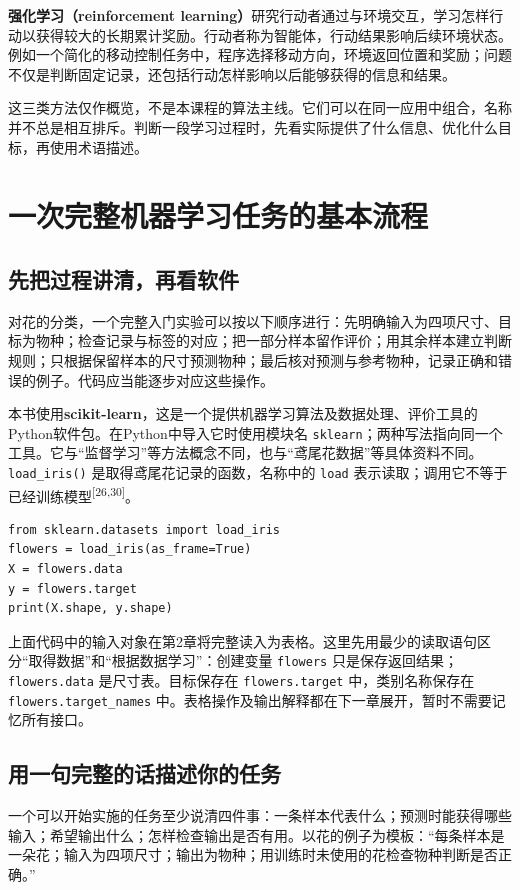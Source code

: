 \textbf{强化学习（reinforcement learning）}研究行动者通过与环境交互，学习怎样行动以获得较大的长期累计奖励。行动者称为智能体，行动结果影响后续环境状态。例如一个简化的移动控制任务中，程序选择移动方向，环境返回位置和奖励；问题不仅是判断固定记录，还包括行动怎样影响以后能够获得的信息和结果。

这三类方法仅作概览，不是本课程的算法主线。它们可以在同一应用中组合，名称并不总是相互排斥。判断一段学习过程时，先看实际提供了什么信息、优化什么目标，再使用术语描述。

\section{一次完整机器学习任务的基本流程}
\subsection{先把过程讲清，再看软件}
对花的分类，一个完整入门实验可以按以下顺序进行：先明确输入为四项尺寸、目标为物种；检查记录与标签的对应；把一部分样本留作评价；用其余样本建立判断规则；只根据保留样本的尺寸预测物种；最后核对预测与参考物种，记录正确和错误的例子。代码应当能逐步对应这些操作。

本书使用\textbf{scikit-learn}，这是一个提供机器学习算法及数据处理、评价工具的Python软件包。在Python中导入它时使用模块名 \texttt{sklearn}；两种写法指向同一个工具。它与“监督学习”等方法概念不同，也与“鸢尾花数据”等具体资料不同。\texttt{load\_iris()} 是取得鸢尾花记录的函数，名称中的 \texttt{load} 表示读取；调用它不等于已经训练模型\textsuperscript{[26,30]}。

\begin{lstlisting}[caption={只读取已介绍的鸢尾花数据，不进行训练}]
from sklearn.datasets import load_iris
flowers = load_iris(as_frame=True)
X = flowers.data
y = flowers.target
print(X.shape, y.shape)
\end{lstlisting}

\noindent 上面代码中的输入对象在第2章将完整读入为表格。这里先用最少的读取语句区分“取得数据”和“根据数据学习”：创建变量 \texttt{flowers} 只是保存返回结果；\texttt{flowers.data} 是尺寸表。目标保存在 \texttt{flowers.target} 中，类别名称保存在 \texttt{flowers.target\_names} 中。表格操作及输出解释都在下一章展开，暂时不需要记忆所有接口。


\subsection{用一句完整的话描述你的任务}
一个可以开始实施的任务至少说清四件事：一条样本代表什么；预测时能获得哪些输入；希望输出什么；怎样检查输出是否有用。以花的例子为模板：“每条样本是一朵花；输入为四项尺寸；输出为物种；用训练时未使用的花检查物种判断是否正确。”

